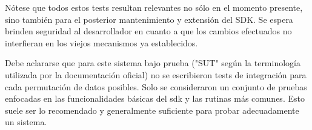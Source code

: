 N\'otese que todos estos tests resultan relevantes no s\'olo en el momento presente, sino tambi\'en para el posterior mantenimiento y extensi\'on del SDK. Se espera brinden seguridad al desarrollador en cuanto a que los cambios efectuados no interfieran en los viejos mecanismos ya establecidos.






Debe aclararse que para este sistema bajo prueba ("SUT" seg\'un la terminolog\'ia utilizada por la documentaci\'on oficial) no se escribieron tests de integración para cada permutación de datos posibles. Solo se consideraron un conjunto de pruebas enfocadas en las funcionalidades b\'asicas del sdk y las rutinas m\'as comunes. Esto suele ser lo recomendado y generalmente suficiente para probar adecuadamente un sistema. 


